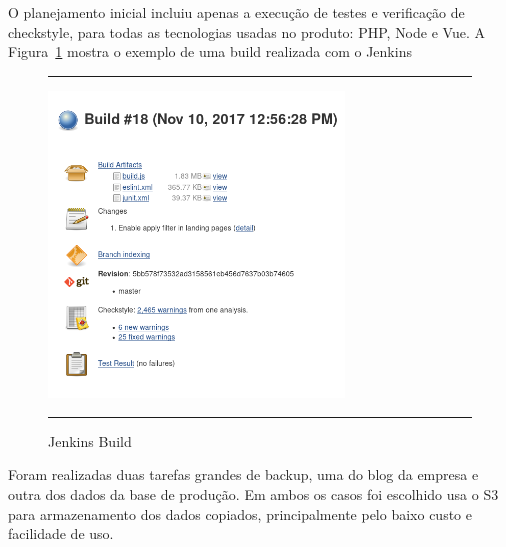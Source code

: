 O planejamento inicial incluiu apenas a execução de testes e verificação de \gls{checkstyle}, para todas as tecnologias usadas no produto: \gls{PHP}, \gls{Node} e \gls{Vue}. A Figura~\ref{fig:jenkinsBuild} mostra o exemplo de uma build realizada com o \gls{Jenkins}\\

\begin{figure}[h]
  \rule[1ex]{\textwidth}{0.25pt}
  \centering\includegraphics[width=0.70\textwidth]{img/JenkinsBuild.png}
  \caption[Jenkins Build]
  {Jenkins Build}\label{fig:jenkinsBuild}
  \rule[1ex]{\textwidth}{0.25pt}
\end{figure}

Foram realizadas duas tarefas grandes de \gls{backup}, uma do blog da empresa e outra dos dados da base de produção. Em ambos os casos foi escolhido usa o \gls{S3} para armazenamento dos dados copiados, principalmente pelo baixo custo e facilidade de uso.\\


%
%

%
%



